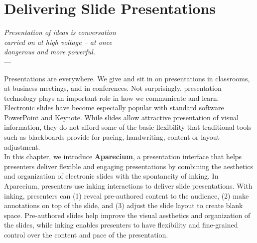 
\chapter{Delivering Slide Presentations} %
\label{ch:aparecium} %

\begin{flushright}{\slshape    
Presentation of ideas is conversation \\
carried on at high voltage -- at once \\
dangerous and more powerful.}\\ \medskip
---  \citep{boettinger:1989}
\end{flushright}

Presentations are everywhere. We give and sit in on presentations in classrooms, at business meetings, and in conferences. Not surprisingly, presentation technology plays an important role in how we communicate and learn. \\

Electronic slides have become especially popular with standard software PowerPoint and Keynote. While slides allow attractive presentation of visual information, they do not afford some of the basic flexibility that traditional tools such as blackboards provide for pacing, handwriting, content or layout adjustment. \\

In this chapter, we introduce \textbf{Aparecium}, 
%
%
a presentation interface that helps presenters deliver flexible and engaging presentations by combining the aesthetics and organization of electronic slides with the spontaneity of inking. In Aparecium, presenters use inking interactions to deliver slide presentations. With inking, presenters can (1) reveal pre-authored content to the audience, (2) make annotations on top of the slide, and (3) adjust the slide layout to create blank space. Pre-authored slides help improve the visual aesthetics and organization of the slides, while inking enables presenters to have flexibility and fine-grained control over the content and pace of the presentation.\\

